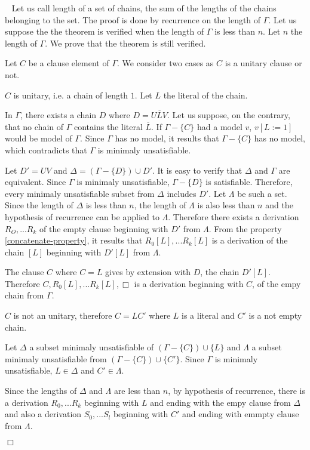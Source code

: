 \documentclass{article}
\newenvironment{preuve}{\noindent {\em Proof :}\ }{{\hfill
    $\Box$}\vspace{.5pc}} \newcommand{\sg}{\!\!<\!\!}
\begin{document}
\begin{preuve}
Let us call length of a set of chains, the sum of the lengths of the chains belonging to the set. The proof is done by 
recurrence on the length of $\Gamma$. Let us suppose the the theorem is verified when the length of $\Gamma$ is less than $n$.
Let $n$ the length of $\Gamma$. We prove that the theorem is still verified.

Let $C$ be a clause element of $\Gamma$. We consider two cases as $C$ is a unitary clause or not.
\begin{itemrond}
\item $C$ is unitary, i.e. a chain of length $1$. Let $L$ the literal of the chain.

In $\Gamma$, there exists a chain $D$ where $D=U\overline{L}V$. Let us suppose, on the contrary, that no chain of $\Gamma$
contains the literal $\overline{L}$.  If $\Gamma - \{C\}$  had a model $v$, $v[L:=1]$ would be model of $\Gamma$.
Since $\Gamma$ has no model, it results that $\Gamma -\{C\}$ has no model, which contradicts that $\Gamma$ is minimaly 
unsatisfiable.

Let $D'=UV$ and $\Delta=(\Gamma - \{D\}) \cup D'$. It is easy to verify that $\Delta$ and $\Gamma$ are equivalent.
Since $\Gamma$ is minimaly unsatisfiable, $\Gamma - \{D\}$ is satisfiable. Therefore,  every minimaly unsatisfiable
subset from $\Delta$ includes $D'$. Let $\Lambda$ be such a set. Since the length of $\Delta$ is less than $n$, the length of
$\Lambda$ is also less than $n$ and the hypothesis of recurrence can be applied to $\Lambda$.
Therefore there exists a derivation $R_O, ...R_k$ of the empty clause beginning with $D'$ from $\Lambda$.
From the property \ref{concatenate-property}, it results that $R_0[L],...R_k[L]$ is a derivation of the chain $[L]$ beginning
with $D'[L]$ from $\Lambda$.

The clause $C$ where $C=L$ gives by extension with $D$, the chain $D'[L]$. Therefore $C,R_0[L],...R_k[L],\Box$ is a derivation
beginning with $C$, of the empy chain from $\Gamma$.

\item $C$ is not an unitary, therefore $C=LC'$ where $L$ is a literal and $C'$ is a not empty chain.

Let $\Delta$ a subset minimaly unsatisfiable of $(\Gamma-\{C\})\cup \{L\}$ and $\Lambda$ a subset minimaly unsatisfiable
from $(\Gamma - \{C\}) \cup \{C'\}$. Since $\Gamma$ is minimaly unsatisfiable, $L \in \Delta$ and $C' \in \Lambda$.

Since the lengths of $\Delta$ and $\Lambda$ are less than $n$, by hypothesis of recurrence, there is a derivation 
$R_0,...R_k$ beginning with $L$ and ending with the empy clause from $\Delta$ 
and also a derivation $S_0,...S_l$ beginning with $C'$
and ending with emmpty clause from $\Lambda$.


\end{itemrond}
\end{preuve}
\end{document}
